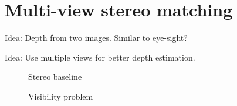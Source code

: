 \section{Multi-view stereo matching}

Idea: Depth from two images. Similar to eye-sight?

Idea: Use multiple views for better depth estimation.

\begin{figure}[ht]
    \centering
    \caption{Stereo baseline}
    \label{fig:stereo-baseline}
\end{figure}

\begin{figure}[ht]
    \centering
    \caption{Visibility problem}
    \label{fig:visibility-problem}
\end{figure}
